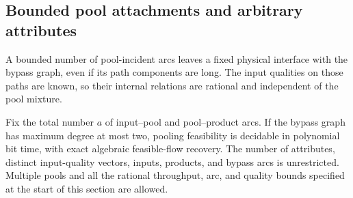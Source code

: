 \subsection{Bounded pool attachments and arbitrary attributes}
\label{s4:attachments}

A bounded number of pool-incident arcs leaves a fixed physical
interface with the bypass graph, even if its path components are long.
The input qualities on those paths are known, so their internal
relations are rational and independent of the pool mixture.

\begin{theorem}
\label{s4:bounded-attachments}
Fix the total number $a$ of input--pool and pool--product arcs.
If the bypass graph has maximum degree at most two, pooling feasibility
is decidable in polynomial bit time, with exact algebraic feasible-flow
recovery. The number of attributes, distinct input-quality vectors,
inputs, products, and bypass arcs is unrestricted. Multiple pools and
all the rational throughput, arc, and quality bounds specified at the
start of this section are allowed.
\end{theorem}
